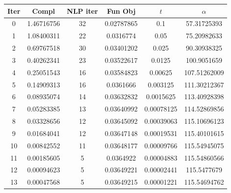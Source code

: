 \begin{tabular}{c c c c c c}
\toprule
Iter & Compl & NLP iter & Fun Obj & $t$ & $\alpha$ \\
\midrule
0 & 1.46716756 & 32 & 0.02787865 & 0.1 & 57.31725393 \\
1 & 1.08400311 & 22 & 0.0316774 & 0.05 & 75.20982633 \\
2 & 0.69767518 & 30 & 0.03401202 & 0.025 & 90.30938325 \\
3 & 0.40262341 & 23 & 0.03522617 & 0.0125 & 100.9051659 \\
4 & 0.25051543 & 16 & 0.03584823 & 0.00625 & 107.51262009 \\
5 & 0.14909313 & 16 & 0.0361666 & 0.003125 & 111.30212367 \\
6 & 0.08935074 & 14 & 0.03632832 & 0.0015625 & 113.40928398 \\
7 & 0.05283385 & 13 & 0.03640992 & 0.00078125 & 114.52869856 \\
8 & 0.03328656 & 12 & 0.03645092 & 0.00039063 & 115.10696123 \\
9 & 0.01684041 & 12 & 0.03647148 & 0.00019531 & 115.40101615 \\
10 & 0.00842552 & 11 & 0.03648177 & 0.00009766 & 115.54945075 \\
11 & 0.00185605 & 5 & 0.0364922 & 0.00004883 & 115.54860566 \\
12 & 0.00094623 & 5 & 0.03649221 & 0.00002441 & 115.5477679 \\
13 & 0.00047568 & 5 & 0.03649215 & 0.00001221 & 115.54694762 \\
\bottomrule
\end{tabular}